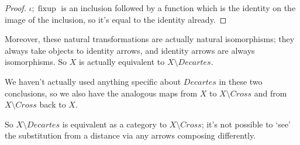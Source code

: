 \documentclass{proc-l}
\theoremstyle{definition}
\theoremstyle{remark}
\numberwithin{equation}{section}
\begin{document}
\begin{proof}
\(\iota; \operatorname{fixup}\) is an inclusion followed by a function which is the identity on the image of the inclusion,
so it's equal to the identity already.
\end{proof}

Moreover, these natural transformations are actually natural isomorphisms; they always take objects to identity arrows, and identity arrows are always isomorphisms. So \(X\) is actually equivalent to \(X \setminus Decartes\).

We haven't actually used anything specific about \(Decartes\) in these two conclusions, so we also have the analogous maps from \(X\) to \(X \setminus Cross\) and from \(X \setminus Cross\) back to \(X\).

So \(X \setminus Decartes\) is equivalent as a category to \(X \setminus Cross\); it's not possible to `see' the substitution from a distance via any arrows composing differently.
\end{document}

